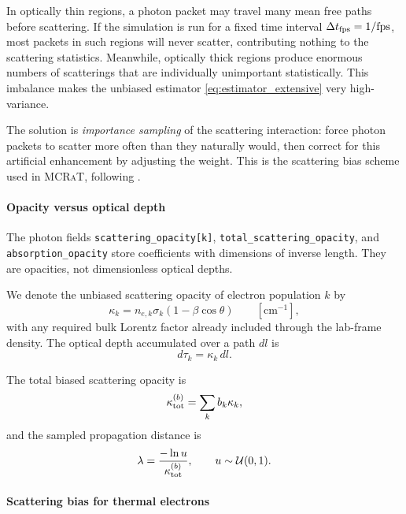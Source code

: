 \documentclass[12pt,a4paper]{article}
\newcommand{\code}[1]{\texttt{#1}}
\newcommand{\mcrat}{\textsc{MCRaT}}
\begin{document}
In optically thin regions, a photon packet may travel many mean free paths
before scattering.  If the simulation is run for a fixed time interval
$\Delta t_{\rm fps} = 1/\text{fps}$, most packets in such regions will
never scatter, contributing nothing to the scattering statistics.  Meanwhile,
optically thick regions produce enormous numbers of scatterings that are
individually unimportant statistically.  This imbalance makes the unbiased
estimator \eqref{eq:estimator_extensive} very high-variance.

The solution is \emph{importance sampling} of the scattering interaction:
force photon packets to scatter more often than they naturally would, then
correct for this artificial enhancement by adjusting the weight.  This is
the scattering bias scheme used in \mcrat{}, following
\citet{kawashima2023,dolence2009}.

\paragraph{Opacity versus optical depth}
\label{sec:opacity_notation}

The photon fields
\code{scattering\_opacity[k]},
\code{total\_scattering\_opacity}, and
\code{absorption\_opacity} store coefficients with dimensions of
inverse length. They are opacities, not dimensionless optical depths.

We denote the unbiased scattering opacity of electron population \(k\)
by
\begin{equation}
	\kappa_k
	=
	n_{e,k}\sigma_k
	\left(1-\beta\cos\theta\right)
	\qquad
	[\mathrm{cm^{-1}}],
	\label{eq:chi_k}
\end{equation}
with any required bulk Lorentz factor already included through the
lab-frame density. The optical depth accumulated over a path \(dl\) is
\begin{equation}
	d\tau_k
	=
	\kappa_k\,dl.
	\label{eq:dtau_k}
\end{equation}

The total biased scattering opacity is
\begin{equation}
	\kappa_{\rm tot}^{(b)}
	=
	\sum_k b_k\kappa_k,
	\label{eq:chi_total_biased}
\end{equation}
and the sampled propagation distance is
\begin{equation}
	\lambda
	=
	\frac{-\ln u}{\kappa_{\rm tot}^{(b)}},
	\qquad
	u\sim\mathcal{U}(0,1).
	\label{eq:mfp_total}
\end{equation}

\paragraph{Scattering bias for thermal electrons}
\label{sec:thermal_bias}
\end{document}
